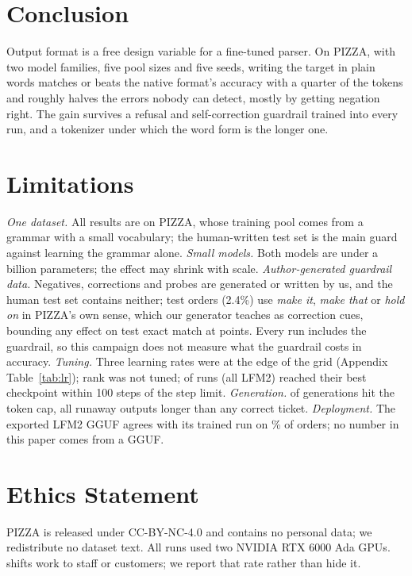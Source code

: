 \documentclass[11pt]{article}
\begin{document}
\section{Conclusion}

Output format is a free design variable for a fine-tuned parser. On PIZZA, with two
model families, five pool sizes and five seeds, writing the target in plain words
matches or beats the native format's accuracy with a quarter of the tokens and
roughly halves the errors nobody can detect, mostly by getting negation right. The
gain survives a refusal and self-correction guardrail trained into every run, and a
tokenizer under which the word form is the longer one.

\section*{Limitations}

\emph{One dataset.} All results are on PIZZA, whose training pool comes from a
grammar with a small vocabulary; the human-written test set is the main guard
against learning the grammar alone. \emph{Small models.} Both models are under a
billion parameters; the effect may shrink with scale. \emph{Author-generated
guardrail data.} Negatives, corrections and probes are generated or written by us,
and the human test set contains neither; \cueRows{} test orders (2.4\%) use
\emph{make it}, \emph{make that} or \emph{hold on} in PIZZA's own sense, which our
generator teaches as correction cues, bounding any effect on test exact match at
\cueBound{} points. Every run includes the guardrail, so this campaign does not
measure what the guardrail costs in accuracy. \emph{Tuning.} Three
learning rates were at the edge of the grid (Appendix Table~\ref{tab:lr}); rank was
not tuned; \lateRuns{} of \nGrid{} runs (all LFM2) reached their best checkpoint
within 100 steps of the step limit. \emph{Generation.} \capHits{} of
\nGenerations{} generations hit the token cap, all runaway outputs longer than any
correct ticket. \emph{Deployment.} The exported LFM2 GGUF agrees with its trained
run on \lfmGgufAgree{}\% of orders; no number in this paper comes from a GGUF.

\section*{Ethics Statement}

PIZZA is released under CC-BY-NC-4.0 and contains no personal data; we
redistribute no dataset text. All runs used two NVIDIA RTX 6000 Ada GPUs.
shifts work to staff or customers; we report that rate rather than hide it.
\end{document}
